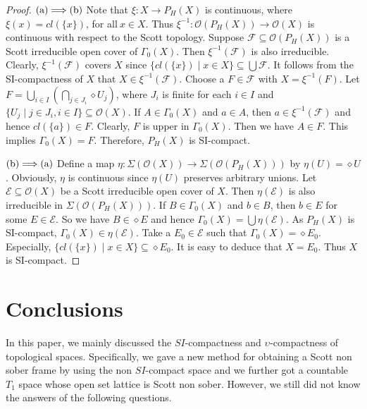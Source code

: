 \documentclass[preprint,12pt]{elsarticle}
\numberwithin{equation}{section}
\begin{document}
\begin{proof}${\rm(a)\Longrightarrow(b)}$ Note that $\xi:X\longrightarrow P_{H}(X)$ is continuous, where $\xi(x)=cl(\{x\})$, for all$\ x\in X$. Thus $\xi^{-1}:\mathcal{O}(P_{H}(X))\longrightarrow\mathcal{O}(X)$ is continuous with respect to the Scott topology. Suppose $\mathcal{F}\subseteq\mathcal{O}(P_{H}(X))$ is a Scott irreducible open cover of $\Gamma_{0}(X)$. Then $\xi^{-1}(\mathcal{F})$ is also irreducible. Clearly, $\xi^{-1}(\mathcal{F})$ covers $X$ since $\{cl(\{x\})\mid x\in X\}\subseteq \bigcup\mathcal{F}$. It follows from the SI-compactness of $X$ that $X\in\xi^{-1}(\mathcal{F})$. Choose a $F\in\mathcal{F}$ with $X=\xi^{-1}(F)$. Let $F=\bigcup\limits_{i\in I}(\bigcap\limits_{j\in J_{i}}\diamond U_{j})$, where  $J_{i}$ is finite for each $i\in I$ and $\{U_{j}\mid j\in J_{i}, i\in I\}\subseteq\mathcal{O}(X)$. If $A\in\Gamma_{0}(X)$ and $a\in A$, then $a\in\xi^{-1}(\mathcal{F})$ and hence $cl(\{a\})\in F$. Clearly, $F$ is upper in $\Gamma_{0}(X)$. Then we have $A\in F$. This implies $\Gamma_{0}(X)=F$. Therefore, $P_{H}(X)$ is SI-compact.

${\rm(b)\Longrightarrow(a)}$ Define a map $\eta:\Sigma(\mathcal{O}(X))\longrightarrow\Sigma(\mathcal{O}(P_{H}(X)))$ by $\eta(U)=\diamond U$. Obviously, $\eta$ is continuous since $\eta(U)$ preserves arbitrary unions. Let $\mathcal{E}\subseteq\mathcal{O}(X)$ be a Scott irreducible open cover of $X$. Then $\eta(\mathcal{E})$ is also irreducible in $\Sigma(\mathcal{O}(P_{H}(X)))$. If $B\in\Gamma_{0}(X)$ and $b\in B$, then $b\in E$ for some $E\in\mathcal{E}$. So we have $B\in\diamond E$ and hence $\Gamma_{0}(X)=\bigcup\eta(\mathcal{E})$. As $P_{H}(X)$ is SI-compact, $\Gamma_{0}(X)\in\eta(\mathcal{E})$. Take a $E_{0}\in\mathcal{E}$ such that $\Gamma_{0}(X)=\diamond E_{0}$. Especially, $\{cl(\{x\})\mid x\in X\}\subseteq\diamond E_{0}$. It is easy to deduce that $X=E_{0}$. Thus $X$ is SI-compact.\end{proof}

\section{Conclusions }
In this paper, we mainly discussed the $SI$-compactness and $\upsilon$-compactness of topological spaces. Specifically, we gave a new method for obtaining a Scott non sober frame by using the non $SI$-compact space and we further got a countable $T_{1}$ space whose open set lattice is Scott non sober. However, we still did not know the answers of the following questions.
\end{document}
